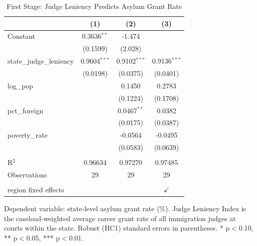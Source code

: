 \begin{table}[htbp]
   \caption{\label{tab:first_stage} First Stage: Judge Leniency Predicts Asylum Grant Rate}
   \bigskip
   \centering
   \begin{tabular}{lccc}
      \toprule
                               & (1)            & (2)            & (3)\\  
      \midrule 
      Constant                 & 0.3636$^{**}$  & -1.474         &   \\   
                               & (0.1599)       & (2.028)        &   \\   
      state\_judge\_leniency   & 0.9604$^{***}$ & 0.9102$^{***}$ & 0.9136$^{***}$\\   
                               & (0.0198)       & (0.0375)       & (0.0401)\\   
      log\_pop                 &                & 0.1450         & 0.2783\\   
                               &                & (0.1224)       & (0.1708)\\   
      pct\_foreign             &                & 0.0467$^{**}$  & 0.0382\\   
                               &                & (0.0175)       & (0.0387)\\   
      poverty\_rate            &                & -0.0564        & -0.0495\\   
                               &                & (0.0583)       & (0.0639)\\   
       \\
      R$^2$                    & 0.96634        & 0.97270        & 0.97485\\  
      Observations             & 29             & 29             & 29\\  
       \\
      region fixed effects     &                &                & $\checkmark$\\   
      \bottomrule
   \end{tabular}
   
   \par \raggedright 
   Dependent variable: state-level asylum grant rate (\%). Judge Leniency Index is the caseload-weighted average career grant rate of all immigration judges at courts within the state. Robust (HC1) standard errors in parentheses. * p$<$0.10, ** p$<$0.05, *** p$<$0.01.
\end{table}
